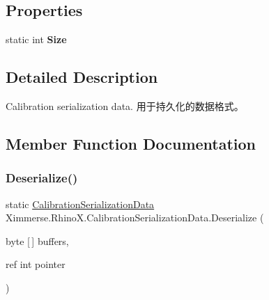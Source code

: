 \subsection*{Properties}
\begin{DoxyCompactItemize}
\item 
\mbox{\label{class_ximmerse_1_1_rhino_x_1_1_calibration_serialization_data_a1485e91da74bc2ad82ba0e3d4aeb6df3}} 
static int {\bfseries Size}
\end{DoxyCompactItemize}


\subsection{Detailed Description}
Calibration serialization data. 用于持久化的数据格式。 



\subsection{Member Function Documentation}
\mbox{\label{class_ximmerse_1_1_rhino_x_1_1_calibration_serialization_data_ab86d9a60c838e8fe8503f0b9126ef86e}} 
\subsubsection{\texorpdfstring{Deserialize()}{Deserialize()}}
{\footnotesize\ttfamily static \mbox{\hyperlink{class_ximmerse_1_1_rhino_x_1_1_calibration_serialization_data}{Calibration\+Serialization\+Data}} Ximmerse.\+Rhino\+X.\+Calibration\+Serialization\+Data.\+Deserialize (\begin{DoxyParamCaption}\item[{byte \mbox{[}$\,$\mbox{]}}]{buffers,  }\item[{ref int}]{pointer }\end{DoxyParamCaption})\hspace{0.3cm}{\ttfamily [static]}}



